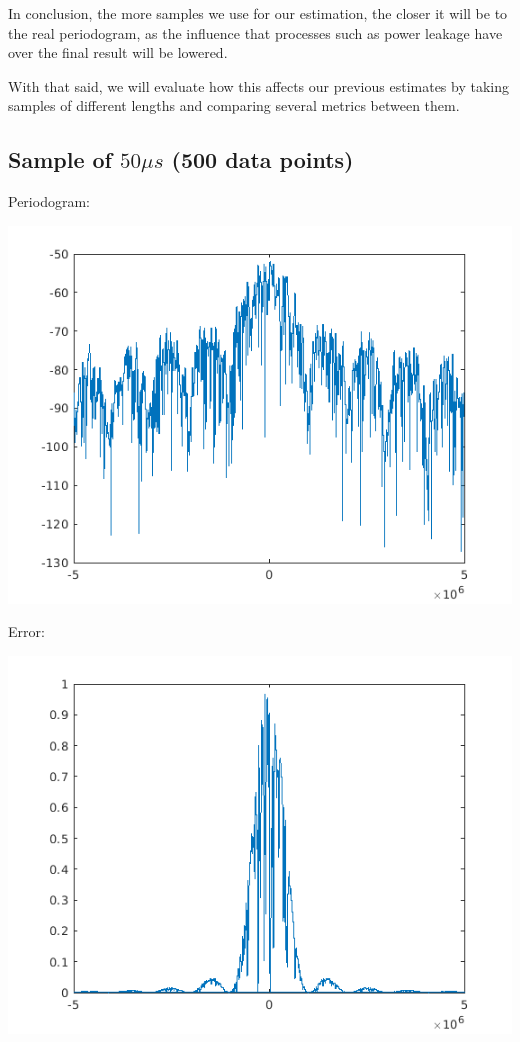 \documentclass[conference,9pt]{IEEEtran}
\begin{document}
In conclusion, the more samples we use for our estimation, the closer it will be to the real periodogram, as the influence that processes such as power leakage have over the final result will be lowered.

\pagebreak

With that said, we will evaluate how this affects our previous estimates by taking samples of different lengths and comparing several metrics between them.

\subsection{Sample of $50\mu s$ (500 data points)}
Periodogram:

\includegraphics[scale=0.6]{perio500.png}

Error:

\includegraphics[scale=0.6]{error50.png}
\end{document}
